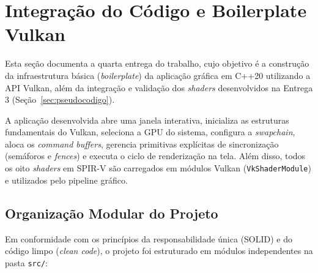 
\section{Integração do Código e Boilerplate Vulkan}
\label{sec:boilerplate}
\sloppy

Esta seção documenta a quarta entrega do trabalho, cujo objetivo é a construção da infraestrutura básica (\textit{boilerplate}) da aplicação gráfica em C++20 utilizando a API Vulkan, além da integração e validação dos \textit{shaders} desenvolvidos na Entrega 3 (Seção~\ref{sec:pseudocodigo}).

A aplicação desenvolvida abre uma janela interativa, inicializa as estruturas fundamentais do Vulkan, seleciona a GPU do sistema, configura a \textit{swapchain}, aloca os \textit{command buffers}, gerencia primitivas explícitas de sincronização (semáforos e \textit{fences}) e executa o ciclo de renderização na tela. Além disso, todos os oito \textit{shaders} em SPIR-V são carregados em módulos Vulkan (\texttt{VkShaderModule}) e utilizados pelo pipeline gráfico.

\subsection{Organização Modular do Projeto}
Em conformidade com os princípios da responsabilidade única (SOLID) e do código limpo (\textit{clean code}), o projeto foi estruturado em módulos independentes na pasta \texttt{src/}:

